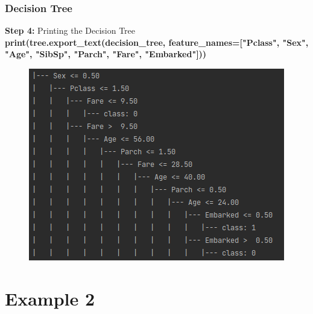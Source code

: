 \documentclass{beamer}
\begin{document}
\begin{frame}
	\frametitle{Decision Tree}
	\begin{flushleft}
		\textbf{Step 4:} Printing the Decision Tree \\
		\textbf{\color{blue} \scriptsize
			print(tree.export\_text(decision\_tree, feature\_names=["Pclass", "Sex", "Age", "SibSp", "Parch", "Fare", "Embarked"]))
		}
	\end{flushleft}
	\begin{center}
		\begin{figure}
	    \includegraphics[width=0.5\linewidth]{./src/figures/7_1.png}
	  \end{figure}
	\end{center}
\end{frame}


\section{Example 2}

\end{document}
